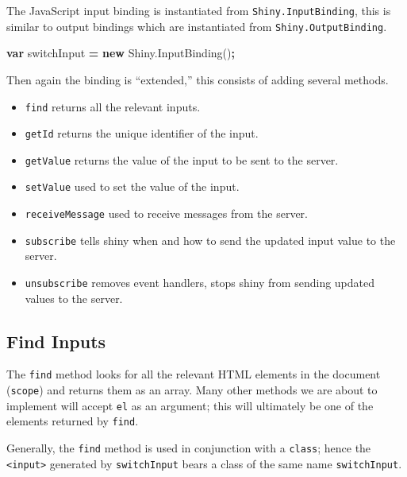 \documentclass[
]{krantz}
\makeatletter
\newenvironment{Shaded}{\begin{snugshade}}{\end{snugshade}}
\newcommand{\AttributeTok}[1]{\textcolor[rgb]{0.61,0.61,0.61}{#1}}
\newcommand{\KeywordTok}[1]{\textcolor[rgb]{0.27,0.27,0.27}{\textbf{#1}}}
\newcommand{\NormalTok}[1]{#1}
\newcommand{\OperatorTok}[1]{\textcolor[rgb]{0.43,0.43,0.43}{\textbf{#1}}}
\newcommand{\VariableTok}[1]{\textcolor[rgb]{0,0,0}{#1}}
\providecommand{\tightlist}{%
  \setlength{\itemsep}{0pt}\setlength{\parskip}{0pt}}
\newenvironment{kframe}{%
\medskip{}
\setlength{\fboxsep}{.8em}
 \def\at@end@of@kframe{}%
 \ifinner\ifhmode%
  \def\at@end@of@kframe{\end{minipage}}%
  \begin{minipage}{\columnwidth}%
 \fi\fi%
 \def\FrameCommand##1{\hskip\@totalleftmargin \hskip-\fboxsep
 \colorbox{shadecolor}{##1}\hskip-\fboxsep
     \hskip-\linewidth \hskip-\@totalleftmargin \hskip\columnwidth}%
 \MakeFramed {\advance\hsize-\width
   \@totalleftmargin\z@ \linewidth\hsize
   \@setminipage}}%
 {\par\unskip\endMakeFramed%
 \at@end@of@kframe}
\renewenvironment{Shaded}{\begin{kframe}}{\end{kframe}}
\makeatother
\begin{document}
The JavaScript input binding is instantiated from \texttt{Shiny.InputBinding}, this is similar to output bindings which are instantiated from \texttt{Shiny.OutputBinding}.

\begin{Shaded}
\begin{Highlighting}[]
\KeywordTok{var}\NormalTok{ switchInput }\OperatorTok{=} \KeywordTok{new} \VariableTok{Shiny}\NormalTok{.}\AttributeTok{InputBinding}\NormalTok{()}\OperatorTok{;}
\end{Highlighting}
\end{Shaded}

Then again the binding is ``extended,'' this consists of adding several methods.

\begin{itemize}
\tightlist
\item
  \texttt{find} returns all the relevant inputs.
\item
  \texttt{getId} returns the unique identifier of the input.
\item
  \texttt{getValue} returns the value of the input to be sent to the server.
\item
  \texttt{setValue} used to set the value of the input.
\item
  \texttt{receiveMessage} used to receive messages from the server.
\item
  \texttt{subscribe} tells shiny when and how to send the updated input value to the server.
\item
  \texttt{unsubscribe} removes event handlers, stops shiny from sending updated values to the server.
\end{itemize}

\hypertarget{shiny-input-find}{%
\subsection{Find Inputs}\label{shiny-input-find}}

The \texttt{find} method looks for all the relevant HTML elements in the document (\texttt{scope}) and returns them as an array. Many other methods we are about to implement will accept \texttt{el} as an argument; this will ultimately be one of the elements returned by \texttt{find}.

Generally, the \texttt{find} method is used in conjunction with a \texttt{class}; hence the \texttt{\textless{}input\textgreater{}} generated by \texttt{switchInput} bears a class of the same name \texttt{switchInput}.
\end{document}
